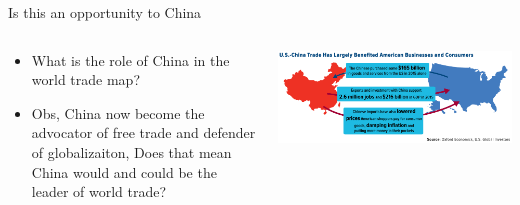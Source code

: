 \documentclass[10pt,hyperref={CJKbookmarks=true},xcolor=dvipsnames,aspectratio=169]{beamer}
\begin{document}
\begin{frame}{Is this an opportunity to China}


\begin{columns}[onlytextwidth]
\begin{column}{0.4\textwidth}
\begin{itemize}
\item What is the role of China in the world trade map?
\item Obs, China now become the advocator of free trade and defender of
globalizaiton, Does that mean China would and could be the leader
of world trade?
\end{itemize}

\end{column}
\begin{column}{0.6\textwidth}
\includegraphics[width=\columnwidth]{fig//trump5}
\end{column}
\end{columns}

\end{frame}
\end{document}
